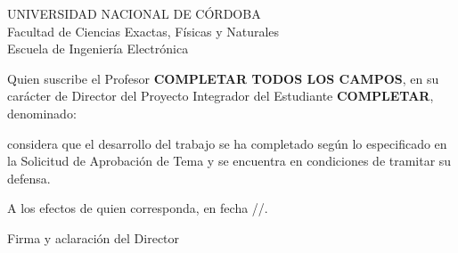 \thispagestyle{empty}

\begin{center}
UNIVERSIDAD NACIONAL DE CÓRDOBA\\
Facultad de Ciencias Exactas, Físicas y Naturales\\
Escuela de Ingeniería Electrónica
\end{center}

\vspace{1.5cm}

Quien suscribe el Profesor \textbf{COMPLETAR TODOS LOS CAMPOS}, en su carácter de Director del Proyecto Integrador del Estudiante \textbf{COMPLETAR}, denominado:

\vspace{0.5cm}

\begin{center}
\textbf{\tituloPI}
\end{center}

\vspace{0.5cm}

considera que el desarrollo del trabajo se ha completado según lo especificado en la Solicitud de Aprobación de Tema y se encuentra en condiciones de tramitar su defensa.

\vspace{1cm}

A los efectos de quien corresponda, en fecha \underline{\hspace{1cm}}/\underline{\hspace{1cm}}/\underline{\hspace{1cm}}.

\vspace{4cm}

\begin{flushright}
Firma y aclaración del Director
\end{flushright}